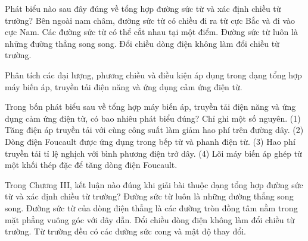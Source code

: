 \begin{ex}
Phát biểu nào sau đây đúng về tổng hợp đường sức từ và xác định chiều từ trường?
\choice
{\True Bên ngoài nam châm, đường sức từ có chiều đi ra từ cực Bắc và đi vào cực Nam.}
{Các đường sức từ có thể cắt nhau tại một điểm.}
{Đường sức từ luôn là những đường thẳng song song.}
{Đổi chiều dòng điện không làm đổi chiều từ trường.}
\end{ex}

\begin{bt}
Phân tích các đại lượng, phương chiều và điều kiện áp dụng trong dạng tổng hợp máy biến áp, truyền tải điện năng và ứng dụng cảm ứng điện từ.
\end{bt}

\begin{ex}
Trong bốn phát biểu sau về tổng hợp máy biến áp, truyền tải điện năng và ứng dụng cảm ứng điện từ, có bao nhiêu phát biểu đúng? Chỉ ghi một số nguyên. (1) Tăng điện áp truyền tải với cùng công suất làm giảm hao phí trên đường dây. (2) Dòng điện Foucault được ứng dụng trong bếp từ và phanh điện từ. (3) Hao phí truyền tải tỉ lệ nghịch với bình phương điện trở dây. (4) Lõi máy biến áp ghép từ một khối thép đặc để tăng dòng điện Foucault.
\end{ex}

\begin{ex}
Trong Chương III, kết luận nào đúng khi giải bài thuộc dạng tổng hợp đường sức từ và xác định chiều từ trường?
\choice
{Đường sức từ luôn là những đường thẳng song song.}
{\True Đường sức từ của dòng điện thẳng là các đường tròn đồng tâm nằm trong mặt phẳng vuông góc với dây dẫn.}
{Đổi chiều dòng điện không làm đổi chiều từ trường.}
{Từ trường đều có các đường sức cong và mật độ thay đổi.}
\end{ex}

